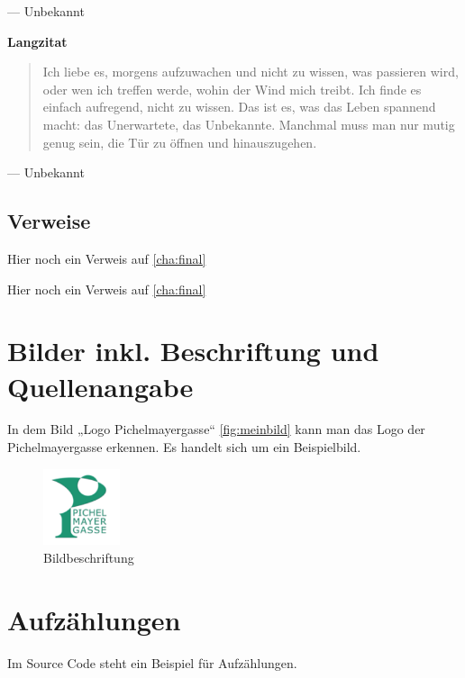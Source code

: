  \hfill --- Unbekannt

\textbf{Langzitat}

\begin{quotation}
	Ich liebe es, morgens aufzuwachen und nicht zu wissen, was passieren wird, oder wen ich treffen werde, wohin der Wind mich treibt. Ich finde es einfach aufregend, nicht zu wissen. Das ist es, was das Leben spannend macht: das Unerwartete, das Unbekannte. Manchmal muss man nur mutig genug sein, die Tür zu öffnen und hinauszugehen.
\end{quotation}
\hfill --- Unbekannt

\subsection{Verweise}
\label{subsec:verweise}

Hier noch ein Verweis auf \cref{cha:final} %

Hier noch ein Verweis auf \vref{cha:final} %

\section{Bilder inkl. Beschriftung und Quellenangabe}
\label{sec:images}

In dem Bild „Logo Pichelmayergasse“ \vref{fig:meinbild} kann man das Logo der Pichelmayergasse erkennen. Es handelt sich um ein Beispielbild.

\begin{figure}[ht]
	\centering
	\includegraphics[width=0.2\textwidth]{figures/BRG_10_Logo.png} %
	\caption[Bildbeschriftung im Abbildungsverzeichnis]{Bildbeschriftung\protect\footnotemark}
	\label{fig:meinbild}
\end{figure}

\section{Aufzählungen}
\label{sec:aufzaehlungen}

Im Source Code steht ein Beispiel für Aufzählungen.

